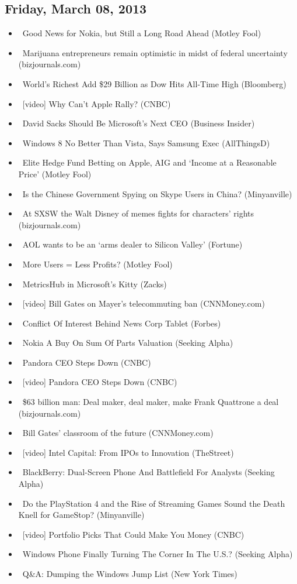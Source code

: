 \documentclass[11pt,asymmetric]{article}
\begin{document}
\subsection*{Friday, March 08, 2013}
\begin{itemize}
\item\ Good News for Nokia, but Still a Long Road Ahead (Motley Fool)
\item\ Marijuana entrepreneurs remain optimistic in midst of federal uncertainty (bizjournals.com)
\item\ World’s Richest Add \$29 Billion as Dow Hits All-Time High (Bloomberg)
\item\ [video] Why Can't Apple Rally? (CNBC)
\item\ David Sacks Should Be Microsoft's Next CEO (Business Insider)
\item\ Windows 8 No Better Than Vista, Says Samsung Exec (AllThingsD)
\item\ Elite Hedge Fund Betting on Apple, AIG and ‘Income at a Reasonable Price’ (Motley Fool)
\item\ Is the Chinese Government Spying on Skype Users in China? (Minyanville)
\item\ At SXSW the Walt Disney of memes fights for characters' rights (bizjournals.com)
\item\ AOL wants to be an `arms dealer to Silicon Valley' (Fortune)
\item\ More Users = Less Profits? (Motley Fool)
\item\ MetricsHub in Microsoft's Kitty (Zacks)
\item\ [video] Bill Gates on Mayer's telecommuting ban (CNNMoney.com)
\item\ Conflict Of Interest Behind News Corp Tablet (Forbes)
\item\ Nokia A Buy On Sum Of Parts Valuation (Seeking Alpha)
\item\ Pandora CEO Steps Down (CNBC)
\item\ [video] Pandora CEO Steps Down (CNBC)
\item\ \$63 billion man: Deal maker, deal maker, make Frank Quattrone a deal (bizjournals.com)
\item\ Bill Gates' classroom of the future (CNNMoney.com)
\item\ [video] Intel Capital: From IPOs to Innovation (TheStreet)
\item\ BlackBerry: Dual-Screen Phone And Battlefield For Analysts (Seeking Alpha)
\item\ Do the PlayStation 4 and the Rise of Streaming Games Sound the Death Knell for GameStop? (Minyanville)
\item\ [video] Portfolio Picks That Could Make You Money (CNBC)
\item\ Windows Phone Finally Turning The Corner In The U.S.? (Seeking Alpha)
\item\ Q\&A: Dumping the Windows Jump List (New York Times)
\end{itemize}
\end{document}
